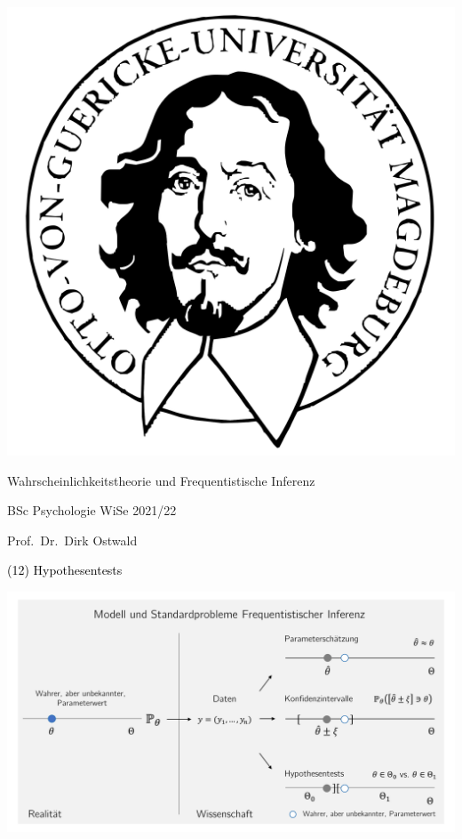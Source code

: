 \documentclass[
  8pt,
  ignorenonframetext,
]{beamer}
\author{}
\date{\vspace{-2.5em}}
\begin{document}
\begin{frame}[plain]{}
\protect\hypertarget{section}{}
\center

\begin{center}\includegraphics[width=0.2\linewidth]{12_Abbildungen/wtfi_12_otto} \end{center}

\vspace{2mm}

\Large

Wahrscheinlichkeitstheorie und Frequentistische Inferenz \vspace{6mm}

\large

BSc Psychologie WiSe 2021/22

\vspace{6mm}
\normalsize

Prof.~Dr.~Dirk Ostwald
\end{frame}

\begin{frame}[plain]{}
\protect\hypertarget{section-1}{}
\vfill
\center
\huge

\textcolor{black}{(12) Hypothesentests} \vfill
\end{frame}

\begin{frame}{}
\protect\hypertarget{section-2}{}
\begin{center}\includegraphics[width=1\linewidth]{12_Abbildungen/wtfi_12_frequentistische_inferenz} \end{center}
\end{frame}
\end{document}
